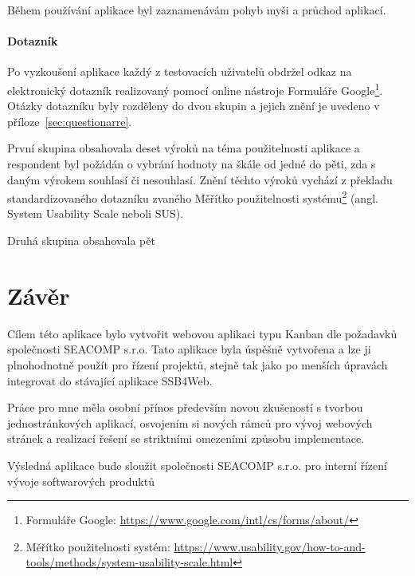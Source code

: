 Během používání aplikace byl zaznamenávám pohyb myši a průchod aplikací.  
\blindtext

\subsubsection{Dotazník}
Po vyzkoušení aplikace každý z testovacích uživatelů obdržel odkaz na elektronický dotazník realizovaný pomocí online nástroje Formuláře Google\footnote{Formuláře Google: \url{https://www.google.com/intl/cs/forms/about/}}. Otázky dotazníku byly rozděleny do dvou skupin a jejich znění je uvedeno v příloze~\ref{sec:questionarre}.

První skupina obsahovala deset výroků na téma použitelnosti aplikace a respondent byl požádán o vybrání hodnoty na škále od jedné do pěti, zda s daným výrokem souhlasí či nesouhlasí. Znění těchto výroků vychází z překladu standardizovaného dotazníku zvaného Měřítko použitelnosti systému\footnote{Měřítko použitelnosti systém: \url{https://www.usability.gov/how-to-and-tools/methods/system-usability-scale.html}} (angl. System Usability Scale neboli SUS).

Druhá skupina obsahovala pět 
\blindtext

\chapter{Závěr}
Cílem této aplikace bylo vytvořit webovou aplikaci typu Kanban dle požadavků společnosti SEACOMP s.r.o. Tato aplikace byla úspěšně vytvořena a lze ji plnohodnotně použít pro řízení projektů, stejně tak jako po menších úpravách integrovat do stávající aplikace SSB4Web.

\blindtext

Práce pro mne měla osobní přínos především novou zkušeností s tvorbou jednostránkových aplikací, osvojením si nových rámců pro vývoj webových stránek a realizací řešení se striktními omezeními způsobu implementace.

Výsledná aplikace bude sloužit společnosti SEACOMP s.r.o. pro interní řízení vývoje softwarových produktů 

